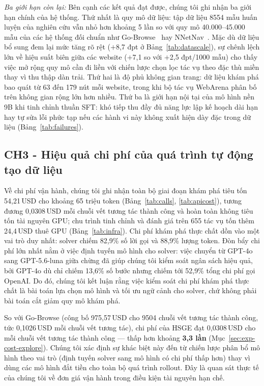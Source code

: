 \emph{Ba giới hạn còn lại:} Bên cạnh các kết quả đạt được, chúng tôi ghi nhận ba giới hạn chính của hệ thống. Thứ nhất là quy mô dữ liệu: tập dữ liệu 8554 mẫu huấn luyện của nghiên cứu vẫn nhỏ hơn khoảng 5 lần so với quy mô 40.000--45.000 mẫu của các hệ thống đối chuẩn như Go-Browse~\cite{gandhi2026gobrowse} hay NNetNav~\cite{murty2024nnetnav}. Mặc dù dữ liệu bổ sung đem lại mức tăng rõ rệt ($+$8{,}7 đpt ở Bảng~\ref{tab:datascale}), sự chênh lệch lớn về hiệu suất biên giữa các website ($+$7{,}1 so với $+$2{,}5 đpt/1000 mẫu) cho thấy việc mở rộng quy mô cần đi liền với chiến lược chọn lọc tác vụ theo đặc thù miền thay vì thu thập dàn trải. Thứ hai là độ phủ không gian trang: dữ liệu khám phá bao quát từ 63 đến 179 nút mỗi website, trong khi bộ tác vụ WebArena phân bố trên không gian rộng lớn hơn nhiều. Thứ ba là giới hạn nội tại của mô hình nền 9B khi tinh chỉnh thuần SFT: khó tiếp thu đầy đủ năng lực lập kế hoạch dài hạn hay tự sửa lỗi phức tạp nếu các hành vi này không xuất hiện dày đặc trong dữ liệu (Bảng~\ref{tab:failures}).

\subsection{CH3 - Hiệu quả chi phí của quá trình tự động tạo dữ liệu}

Về chi phí vận hành, chúng tôi ghi nhận toàn bộ giai đoạn khám phá tiêu tốn 54{,}21\,USD cho khoảng 65 triệu token (Bảng~\ref{tab:calls}, \ref{tab:apicost}), tương đương 0{,}0308\,USD mỗi chuỗi vết tương tác thành công và hoàn toàn không tiêu tốn tài nguyên GPU; chu trình tinh chỉnh và đánh giá trên 655 tác vụ tốn thêm 24{,}4\,USD thuê GPU (Bảng~\ref{tab:infra}). Chi phí khám phá thực chất dồn vào một vai trò duy nhất: solver chiếm 82{,}9\% số lời gọi và 88{,}9\% lượng token. Đòn bẩy chi phí lớn nhất nằm ở việc định tuyến mô hình cho solver: việc chuyển từ GPT-4o sang GPT-5.6-luna giữa chừng đã giúp chúng tôi kiểm soát ngân sách hiệu quả, bởi GPT-4o dù chỉ chiếm 13{,}6\% số bước nhưng chiếm tới 52{,}9\% tổng chi phí gọi OpenAI. Do đó, chúng tôi kết luận rằng việc kiểm soát chi phí khám phá thực chất là bài toán lựa chọn mô hình và tối ưu ngữ cảnh cho solver, chứ không phải bài toán cắt giảm quy mô khám phá.

So với Go-Browse (công bố 975{,}57\,USD cho 9504 chuỗi vết tương tác thành công, tức 0{,}1026\,USD mỗi chuỗi vết tương tác), chi phí của HSGE đạt 0{,}0308\,USD cho mỗi chuỗi vết tương tác thành công — thấp hơn khoảng \textbf{3{,}3 lần} (Mục~\ref{sec:exp-cost-explore}). Chúng tôi xác định sự khác biệt này đến từ chiến lược phân bổ mô hình theo vai trò (định tuyến solver sang mô hình có chi phí thấp hơn) thay vì dùng các mô hình đắt tiền cho toàn bộ quá trình rollout. Đây là quan sát thực tế của chúng tôi về đơn giá vận hành trong điều kiện tài nguyên hạn chế.

